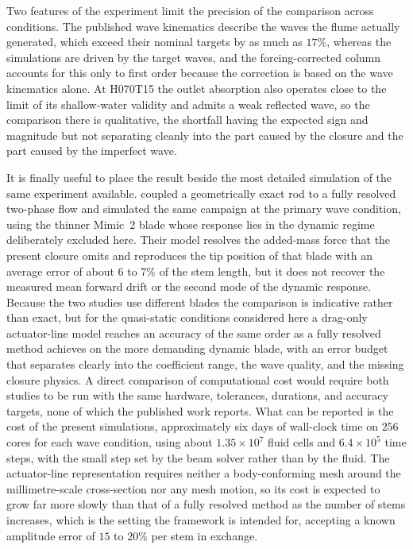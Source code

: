 \noindent
Two features of the experiment limit the precision of the comparison across conditions. The published wave kinematics describe the waves the flume actually generated, which exceed their nominal targets by as much as $17\%$, whereas the simulations are driven by the target waves, and the forcing-corrected column accounts for this only to first order because the correction is based on the wave kinematics alone. At H070T15 the outlet absorption also operates close to the limit of its shallow-water validity and admits a weak reflected wave, so the comparison there is qualitative, the shortfall having the expected sign and magnitude but not separating cleanly into the part caused by the closure and the part caused by the imperfect wave.

\noindent
It is finally useful to place the result beside the most detailed simulation of the same experiment available. \citet{prueter_vegetation_2025} coupled a geometrically exact rod to a fully resolved two-phase flow and simulated the same campaign at the primary wave condition, using the thinner Mimic~2 blade whose response lies in the dynamic regime deliberately excluded here. Their model resolves the added-mass force that the present closure omits and reproduces the tip position of that blade with an average error of about $6$ to $7\%$ of the stem length, but it does not recover the measured mean forward drift or the second mode of the dynamic response. Because the two studies use different blades the comparison is indicative rather than exact, but for the quasi-static conditions considered here a drag-only actuator-line model reaches an accuracy of the same order as a fully resolved method achieves on the more demanding dynamic blade, with an error budget that separates clearly into the coefficient range, the wave quality, and the missing closure physics. A direct comparison of computational cost would require both studies to be run with the same hardware, tolerances, durations, and accuracy targets, none of which the published work reports. What can be reported is the cost of the present simulations, approximately six days of wall-clock time on $256$ cores for each wave condition, using about $1.35\times10^{7}$ fluid cells and $6.4\times10^{5}$ time steps, with the small step set by the beam solver rather than by the fluid. The actuator-line representation requires neither a body-conforming mesh around the millimetre-scale cross-section nor any mesh motion, so its cost is expected to grow far more slowly than that of a fully resolved method as the number of stems increases, which is the setting the framework is intended for, accepting a known amplitude error of $15$ to $20\%$ per stem in exchange.

